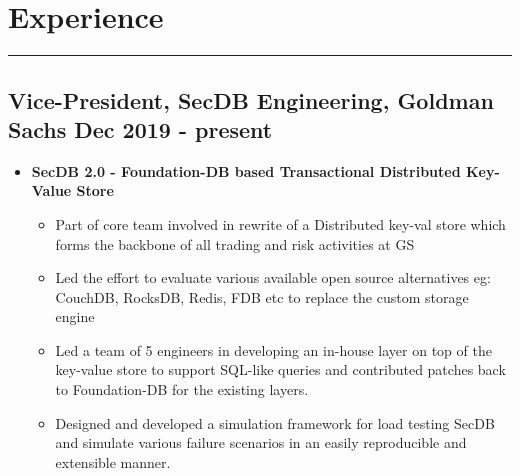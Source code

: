 \section*{Experience}
\hrule
\vspace{0.3cm}
\subsection*{\small {Vice-President, SecDB Engineering, Goldman Sachs \hfill Dec 2019 - present}}
\begin{itemize}[label=\textperiodcentered,labelindent=0pt,itemindent=1em,leftmargin=0.3cm,itemsep=0pt]
    \begin{itemize}[label=\textperiodcentered,itemindent=1em,leftmargin=0.3cm,itemsep=0pt]
        \item \textbf{SecDB 2.0 - Foundation-DB based Transactional Distributed Key-Value Store}
            \begin{itemize}
                \item Part of core team involved in rewrite of a Distributed key-val store which forms the backbone of all trading and risk activities at GS
                \item Led the effort to evaluate various available open source alternatives eg: CouchDB, RocksDB, Redis, FDB etc to replace the custom storage engine
                \item Led a team of 5 engineers in developing an in-house layer on top of the key-value store to support SQL-like queries and contributed patches back to Foundation-DB for the existing layers.
                \item Designed and developed a simulation framework for load testing SecDB and simulate various failure scenarios in an easily reproducible and extensible manner.
            \end{itemize}
\end{itemize}

\end{itemize}

